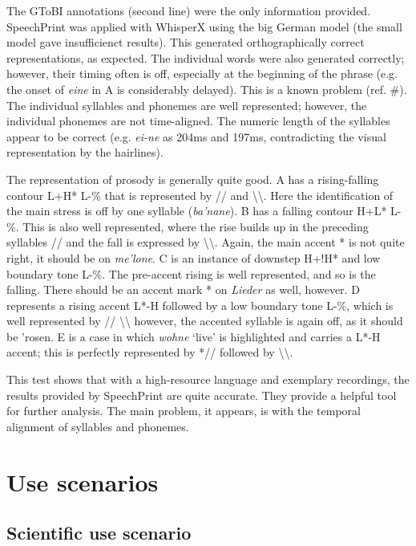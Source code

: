 The GToBI annotations (second line) were the only information provided. SpeechPrint was applied with WhisperX using the big German model (the small model gave insufficienct results). This generated orthographically correct representations, as expected. The individual words were also generated correctly; however, their timing often is off, especially at the beginning of the phrase (e.g. the onset of \textit{eine} in A is considerably delayed). This is a known problem (ref. #). The individual syllables and phonemes are well represented; however, the individual phonemes are not time-aligned. The numeric length of the syllables appear to be correct (e.g. \textit{ei-ne} as 204ms and 197ms, contradicting the visual representation by the hairlines). 

The representation of prosody is generally quite good. A has a rising-falling contour L+H* L-\% that is represented by // and \textbackslash \textbackslash. Here the identification of the main stress is off by one syllable (\textit{ba'nane}). B has a falling contour H+L* L-\%. This is also well represented, where the rise builds up in the preceding syllables // and the fall is expressed by \textbackslash \textbackslash. Again, the main accent * is not quite right, it should be on \textit{me'lone}. C is an instance of downstep H+!H* and low boundary tone L-\%. The pre-accent rising is well represented, and so is the falling. There should be an accent mark * on \textit{Lieder} as well, however. D represents a rising accent L*-H followed by a low boundary tone L-\%, which is well represented by // \textbackslash \textbackslash\; however, the accented syllable is again off, as it should be {'rosen}. E is a case in which \textit{wohne} ‘live’ is highlighted and carries a L*-H accent; this is perfectly represented by *// followed by \textbackslash \textbackslash. 

This test shows that with a high-resource language and exemplary recordings, the results provided by SpeechPrint are quite accurate. They provide a helpful tool for further analysis. The main problem, it appears, is with the temporal alignment of syllables and phonemes. 



\chapter{Use scenarios}
\label{scenarios}

\section{Scientific use scenario}

